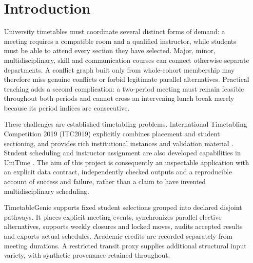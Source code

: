\documentclass[pdflatex,sn-mathphys-num]{sn-jnl}
\theoremstyle{thmstyleone}
\theoremstyle{thmstyletwo}
\theoremstyle{thmstylethree}
\begin{document}

\maketitle

\section{Introduction}\label{sec:intro}

University timetables must coordinate several distinct forms of demand: a meeting requires a compatible room and a qualified instructor, while students must be able to attend every section they have selected. Major, minor, multidisciplinary, skill and communication courses can connect otherwise separate departments. A conflict graph built only from whole-cohort membership may therefore miss genuine conflicts or forbid legitimate parallel alternatives. Practical teaching adds a second complication: a two-period meeting must remain feasible throughout both periods and cannot cross an intervening lunch break merely because its period indices are consecutive.

These challenges are established timetabling problems. International Timetabling Competition 2019 (ITC2019) explicitly combines placement and student sectioning, and provides rich institutional instances and validation material \cite{P01,P02}. Student scheduling and instructor assignment are also developed capabilities in UniTime \cite{P18,P19,D01}. The aim of this project is consequently an inspectable application with an explicit data contract, independently checked outputs and a reproducible account of success and failure, rather than a claim to have invented multidisciplinary scheduling.

TimetableGenie supports fixed student selections grouped into declared disjoint pathways. It places explicit meeting events, synchronizes parallel elective alternatives, supports weekly closures and locked moves, audits accepted results and exports actual schedules. Academic credits are recorded separately from meeting durations. A restricted transit proxy supplies additional structural input variety, with synthetic provenance retained throughout.
\end{document}
